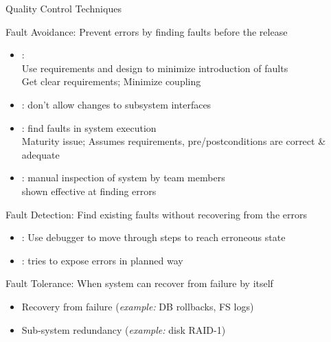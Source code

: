 \begin{frame}[squeeze]{Quality Control Techniques}
  \bigskip

  \begin{block}{\alert{Fault Avoidance:} 
    Prevent errors by finding faults before the release}
    \begin{itemize}\vspace{-.4\baselineskip}
    \item {}: \\
      Use requirements and design to minimize introduction of faults\\
      {\small Get clear requirements; Minimize coupling}
    \item {}: don't allow changes to
      subsystem interfaces
    \item {}: find faults in system execution\\
      {\small Maturity issue; Assumes requirements, pre/postconditions are
        correct \& adequate}
    \item {}: manual inspection of system by team members\\
      {\small shown effective at finding errors}
    \end{itemize}
  \end{block}
  \begin{block}{\alert{Fault Detection:}
      Find existing faults without recovering from the errors}
    \begin{itemize}\vspace{-.4\baselineskip}
    \item {}: Use debugger to move through steps to reach
      erroneous state 
    \item {}: tries to expose errors in planned way
    \end{itemize}
  \end{block}

  \begin{block}{\alert{Fault Tolerance:} When system can recover from failure
      by itself}
    \begin{itemize}\vspace{-.4\baselineskip}
    \item Recovery from failure (\textit{example:} DB rollbacks, FS logs)
    \item Sub-system redundancy (\textit{example:} disk RAID-1)
    \end{itemize}
  \end{block}
\end{frame}
